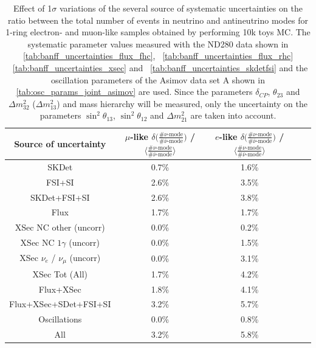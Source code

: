 \begin{table}
\center
\begin{tabular}{| c || c | c || c | c |}
\hline
Source of uncertainty 
&$\mu$-like ${\delta} \Big( \frac{\# {\nu} \text{-mode}}{\# {\bar{\nu}} \text{-mode} } \Big) $ / $\Big \langle \frac{\# {\nu} \text{-mode}}{\# {\bar{\nu}} \text{-mode} } \Big \rangle$ 
&$e$-like ${\delta} \Big( \frac{\# {\nu} \text{-mode}}{\# {\bar{\nu}} \text{-mode} } \Big) $ / $\Big \langle \frac{\# {\nu} \text{-mode}}{\# {\bar{\nu}} \text{-mode} } \Big \rangle$ \\


\hline
SKDet & 0.7\% & 1.6\% \\ \hline
FSI+SI & 2.6\% & 3.5\% \\ \hline
SKDet+FSI+SI & 2.6\% & 3.8\% \\ \hline
\hline
Flux & 1.7\% & 1.7\% \\ \hline
XSec NC other (uncorr) & 0.0\% & 0.2\% \\ \hline
XSec NC $1\gamma$ (uncorr)  & 0.0\%  & 1.5\% \\ \hline
XSec $\nu_e$ / $\nu_{\mu}$ (uncorr)  & 0.0\%  & 3.1\% \\ \hline
XSec Tot  (All) & 1.7\%  & 4.2\% \\ \hline
 \hline
Flux+XSec  & 1.8\%  & 4.1\% \\ \hline
 \hline
Flux+XSec+SDet+FSI+SI  & 3.2\%  & 5.7\% \\ \hline
 \hline
Oscillations  & 0.0\%  & 0.8\% \\ \hline
 \hline
All  & 3.2\%  & 5.8\% \\ \hline
\end{tabular}
\caption{
 Effect of 1$\sigma$ variations of the several source of systematic uncertainties 
 on the ratio between the
 total number of events in neutrino and antineutrino modes
 for 1-ring electron- and muon-like samples
 obtained by performing 10k toys MC.
 The systematic parameter values measured with the ND280 data 
shown in 
\cref{tab:banff_uncertainties_flux_fhc},
~\ref{tab:banff_uncertainties_flux_rhc}
~\ref{tab:banff_uncertainties_xsec}
and
~\ref{tab:banff_uncertainties_skdetfsi}
and the oscillation parameters of the Asimov data set A shown in \cref{tab:osc_params_joint_asimov}
are used.
Since the parameters $\delta_{CP}$, $\theta_{23}$ and $\Delta m^2_{32}$ ($\Delta m^2_{13}$) and mass hierarchy
will be measured,
only the uncertainty on the parameters 
$\sin^2 \theta_{13}$,
$\sin^2 \theta_{12}$
and 
$\Delta m^2_{21}$ 
are taken into account.
}             
\label{tab:ratio_systematic_table_summary_asimov_A}                                                                                                                                                                             
\end{table}

